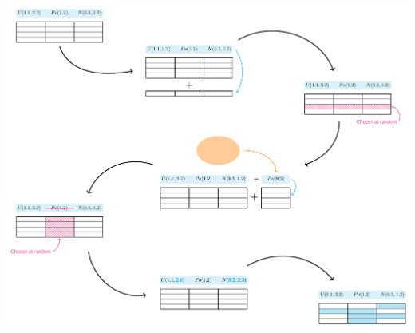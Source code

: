 \documentclass{betterposter}
\begin{document}
{\includegraphics[width=\linewidth]{tex/mutation.pdf}

}
\end{document}
